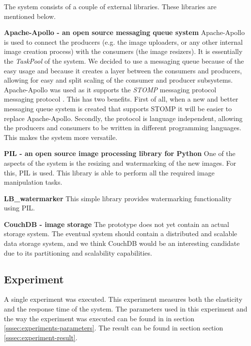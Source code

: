 \documentclass[10pt,journal,compsoc]{IEEEtran}
\begin{document}
The system consists of a couple of external libraries. These libraries are
mentioned below.

\noindent\textbf{Apache-Apollo - an open source messaging queue system}
Apache-Apollo is used to connect the producers (e.g. the image uploaders, or any
other internal image creation process) with the consumers (the image resizers).
It is essentially the \emph{TaskPool} of the system.
We decided to use a messaging queue because of the easy usage and because it
creates a layer between the consumers and producers, allowing for easy and split
scaling of the consumer and producer subsystems. Apache-Apollo was used as it
supports the \emph{STOMP} messaging protocol messaging protocol \cite{stomp}.
This has two benefits. First of all, when a new and better messaging queue
system is created that supports STOMP it will be easier to replace
Apache-Apollo. Secondly, the protocol is language independent, allowing the
producers and consumers to be written in different programming languages.  This
makes the system more versatile. 

\noindent\textbf{PIL - an open source image processing library for Python}
One of the aspects of the system is the resizing and watermarking of the
new images. For this, PIL is used. This library is able to perform all the
required image manipulation tasks.

\noindent\textbf{LB\_watermarker}
This simple library provides watermarking functionality \cite{lb_watermarker}
using PIL.

\noindent\textbf{CouchDB - image storage}
The prototype does not yet contain an actual storage system. The eventual system
should contain a distributed and scalable data storage system, and we think
CouchDB would be an interesting candidate due to its partitioning and
scalability capabilities.

\subsection{Experiment}
\label{ssec:Experiments}
A single experiment was executed. This experiment measures both the elasticity
and the response time of the system. The parameters used in this experiment and
the way the experiment was executed can be found in in section
\ref{sssec:experiments-parameters}. The result can be found in section 
section \ref{sssec:experiment-result}.
\end{document}
